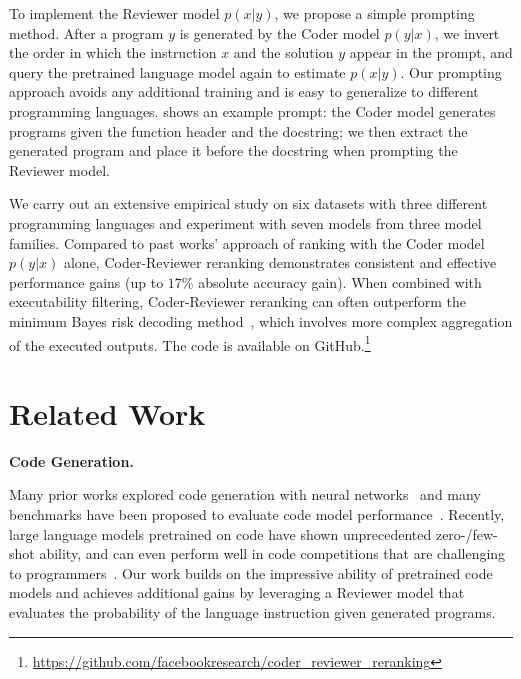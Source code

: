 \documentclass[nohyperref]{article}
\theoremstyle{plain}
\theoremstyle{definition}
\theoremstyle{remark}
\renewcommand{\paragraph}[1]{
     \textbf{#1} 
 }
\begin{document}
 To implement the Reviewer model $p(x|y)$, we propose a simple prompting method. After a program $y$ is generated by the Coder model $p(y|x)$, we invert the order in which the instruction $x$ and the solution $y$ appear in the prompt, and query the pretrained language model again to estimate $p(x|y)$.
Our prompting approach avoids any additional training and is easy to generalize to different programming languages.
 shows an example prompt: the Coder model generates programs given the function header and the docstring; we then extract the generated program and place it before the docstring when prompting the Reviewer model.

We carry out an extensive empirical study on six datasets with three different programming languages and experiment with seven models from three model families. 
Compared to past works' approach of ranking with the Coder model $p(y|x)$ alone, Coder-Reviewer reranking demonstrates consistent and effective performance gains (up to $17\%$ absolute accuracy gain).
When combined with executability filtering, Coder-Reviewer reranking can often outperform the minimum Bayes risk decoding method~\citep{mbr}, which involves more complex aggregation of the executed outputs.
The code is available on GitHub.\footnote{\url{https://github.com/facebookresearch/coder_reviewer_reranking}} \section{Related Work}
\paragraph{Code Generation.}
Many prior works explored code generation with neural networks~\citep{suggest-method-name, ling-etal-2016-latent, concode, syntactic-code, program-repair} and many benchmarks have been proposed to evaluate code model performance~\citep{apps, spider, nl2bash}.
Recently, large language models pretrained on code have shown unprecedented zero-/few-shot ability, and can even perform well in code competitions that are challenging to programmers~\citep{palm, codex,mbpp,alphacode}.
Our work builds on the impressive ability of pretrained code models and achieves additional gains by leveraging a Reviewer model that evaluates the probability of the language instruction given generated programs.
\end{document}
